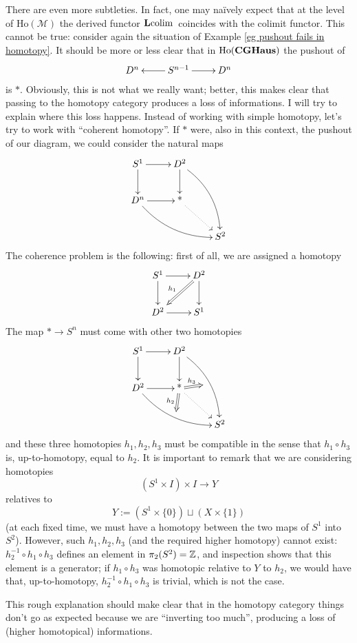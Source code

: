 \begin{refsection}
\begin{rmk}
There are even more subtleties. In fact, one may na\"ively expect that at the level of $\mathrm{Ho}(\mathcal M)$ the derived functor $\mathbf L \mathrm{colim} \,$ coincides with the colimit functor. This cannot be true: consider again the situation of Example \ref{eg pushout fails in homotopy}. It should be more or less clear that in $\mathrm{Ho}(\mathbf{CGHaus})$ the pushout of
\[
\xymatrix{
D^n & S^{n-1} \ar[l] \ar[r] & D^n
}
\]
is $*$. Obviously, this is not what we really want; better, this makes clear that passing to the homotopy category produces a loss of informations. I will try to explain where this loss happens. Instead of working with simple homotopy, let's try to work with ``coherent homotopy''. If $*$ were, also in this context, the pushout of our diagram, we could consider the natural maps
\[
\xymatrix{
S^1 \ar[d] \ar[r] & D^2 \ar@/^1pc/[ddr] \ar[d] \\ D^n \ar[r] \ar@/_1pc/[drr] & \text{*} \ar@{.>}[dr] \\ & & S^2
}
\]
The coherence problem is the following: first of all, we are assigned a homotopy
\[
\xymatrix{
S^1 \ar[d] \ar[r] & D^2 \ar[d] \ar@{=>}[dl]_{h_1} \\ D^2 \ar[r] & S^1
}
\]
The map $* \to S^n$ must come with other two homotopies
\[
\xymatrix{
S^1 \ar[d] \ar[r] & D^2 \ar@/^1pc/[ddr]_{\hspace{1pt}}="a" \ar[d] \\ D^2 \ar[r] \ar@/_1pc/[drr]^{\hspace{1pt}}="b" & \text{*} \ar@{.>}[dr] \ar@{=>}{};"a" ^{h_3} \ar@{=>}{};"b" _{h_2} \\ & & S^2
}
\]
and these three homotopies $h_1,h_2,h_3$ must be compatible in the sense that $h_1 \circ h_3$ is, up-to-homotopy, equal to $h_2$. It is important to remark that we are considering homotopies
\[
(S^1 \times I) \times I \to Y
\]
relatives to
\[
Y := (S^1 \times \{0\}) \sqcup (X \times \{1\})
\]
(at each fixed time, we must have a homotopy between the two maps of $S^1$ into $S^2$). However, such $h_1,h_2,h_3$ (and the required higher homotopy) cannot exist: $h_2^{-1} \circ h_1 \circ h_3$ defines an element in $\pi_2(S^2) = \mathbb{Z}$, and inspection shows that this element is a generator; if $h_1 \circ h_3$ was homotopic relative to $Y$ to $h_2$, we would have that, up-to-homotopy, $h_2^{-1} \circ h_1 \circ h_3$ is trivial, which is not the case.

This rough explanation should make clear that in the homotopy category things don't go as expected because we are ``inverting too much'', producing a loss of (higher homotopical) informations.
\end{rmk}


\end{refsection}
